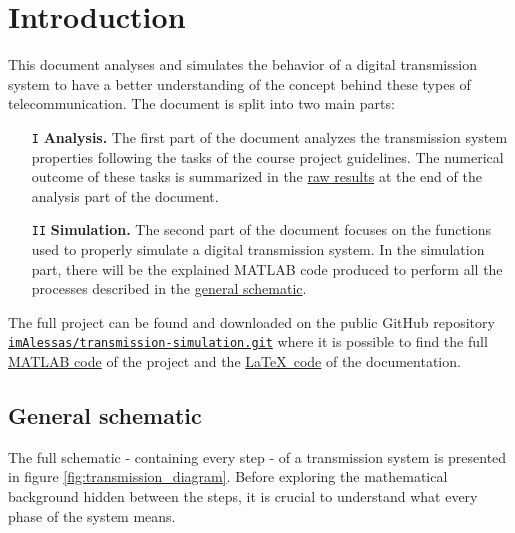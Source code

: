 \setcounter{secnumdepth}{0}
\section{Introduction}
This document analyses and simulates the behavior of a digital transmission system to have a better understanding of the concept behind these types of telecommunication. The document is split into two main parts:

\begin{enumerate}
    \item[\texttt{I}] \hspace{10px} \textbf{Analysis.} The first part of the document analyzes the transmission system properties following the tasks of the course project guidelines. The numerical outcome of these tasks is summarized in the \hyperref[raw-results]{raw results} at the end of the analysis part of the document.
    \item[\texttt{II}] \hspace{10px} \textbf{Simulation.} The second part of the document focuses on the functions used to properly simulate a digital transmission system. In the simulation part, there will be the explained MATLAB code produced to perform all the processes described in the \hyperref[general-schematic]{general schematic}.
\end{enumerate}



\noindent The full project can be found and downloaded on the public GitHub repository \texttt{\href{https://github.com/imAlessas/transmission-simulation.git}{imAlessas/transmission-simulation.git}} where it is possible to find the full \href{https://github.com/imAlessas/transmission-simulation/tree/main/src}{MATLAB code} of the project and the \href{https://github.com/imAlessas/transmission-simulation/tree/main/doc}{\LaTeX\, code} of the documentation.


\subsection{General schematic}\label{general-schematic}
The full schematic - containing every step - of a transmission system is presented in figure \ref{fig:transmission_diagram}. Before exploring the mathematical background hidden between the steps, it is crucial to understand what every phase of the system means.

